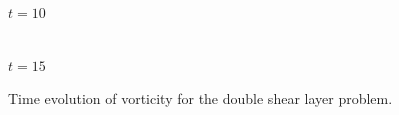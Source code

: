 \documentclass[review]{siamart}
\begin{document}
\begin{figure}
	\vspace{\floatsep}

	\begin{minipage}{\dslfigwidth}
		\centering
		\\
		$t=10$
	\end{minipage}
	\hspace{0.5in}
	\begin{minipage}{\dslfigwidth}
		\centering
		\\
		$t=15$
	\end{minipage}

	\caption{Time evolution of vorticity for the double shear layer problem.}
	\label{fig:dsl}
\end{figure}
\end{document}
